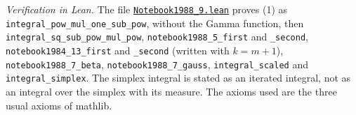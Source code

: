 \emph{Verification in Lean.} The file \href{\leanblobmain/Notebook1988_9.lean}{\texttt{Notebook1988\_9.\allowbreak{}lean}} proves (1) as \texttt{integral\_pow\_mul\_one\_sub\_pow}, without the Gamma function, then \texttt{integral\_sq\_sub\_pow\_mul\_pow}, \texttt{notebook1988\_5\_first} and \texttt{\_second}, \texttt{notebook1984\_13\_first} and \texttt{\_second} (written with $k = m + 1$), \texttt{notebook1988\_7\_beta}, \texttt{notebook1988\_7\_gauss}, \texttt{integral\_scaled} and \texttt{integral\_simplex}. The simplex integral is stated as an iterated integral, not as an integral over the simplex with its measure. The axioms used are the three usual axioms of mathlib.

